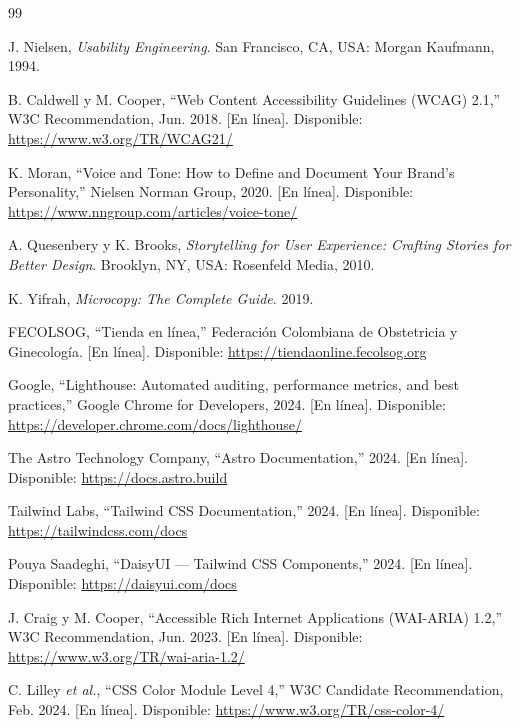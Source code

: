 \documentclass[conference]{IEEEtran}
\begin{document}
\begin{thebibliography}{99}

J. Nielsen, \textit{Usability Engineering}. San Francisco, CA, USA: Morgan Kaufmann, 1994.

B. Caldwell y M. Cooper, ``Web Content Accessibility Guidelines (WCAG) 2.1,'' W3C Recommendation, Jun. 2018. [En línea]. Disponible: \url{https://www.w3.org/TR/WCAG21/}

K. Moran, ``Voice and Tone: How to Define and Document Your Brand's Personality,'' Nielsen Norman Group, 2020. [En línea]. Disponible: \url{https://www.nngroup.com/articles/voice-tone/}

A. Quesenbery y K. Brooks, \textit{Storytelling for User Experience: Crafting Stories for Better Design}. Brooklyn, NY, USA: Rosenfeld Media, 2010.

K. Yifrah, \textit{Microcopy: The Complete Guide}. 2019.

FECOLSOG, ``Tienda en línea,'' Federación Colombiana de Obstetricia y Ginecología. [En línea]. Disponible: \url{https://tiendaonline.fecolsog.org}

Google, ``Lighthouse: Automated auditing, performance metrics, and best practices,'' Google Chrome for Developers, 2024. [En línea]. Disponible: \url{https://developer.chrome.com/docs/lighthouse/}

The Astro Technology Company, ``Astro Documentation,'' 2024. [En línea]. Disponible: \url{https://docs.astro.build}

Tailwind Labs, ``Tailwind CSS Documentation,'' 2024. [En línea]. Disponible: \url{https://tailwindcss.com/docs}

Pouya Saadeghi, ``DaisyUI — Tailwind CSS Components,'' 2024. [En línea]. Disponible: \url{https://daisyui.com/docs}

J. Craig y M. Cooper, ``Accessible Rich Internet Applications (WAI-ARIA) 1.2,'' W3C Recommendation, Jun. 2023. [En línea]. Disponible: \url{https://www.w3.org/TR/wai-aria-1.2/}

C. Lilley \textit{et al.}, ``CSS Color Module Level 4,'' W3C Candidate Recommendation, Feb. 2024. [En línea]. Disponible: \url{https://www.w3.org/TR/css-color-4/}


\end{thebibliography}
\end{document}

